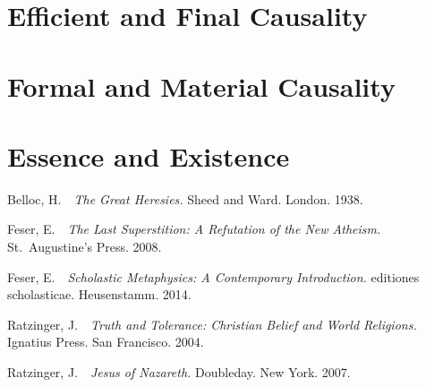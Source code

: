 \documentclass[twocolumn]{article}
\begin{document}
\section{Efficient and Final Causality}

\section{Formal and Material Causality}

\section{Essence and Existence}



\begin{thebibliography}{}

      Belloc, H.\ \ {\it The Great Heresies.}  Sheed and Ward.  London.  1938.

      Feser, E.\ \ {\it The Last Superstition: A Refutation of the New
      Atheism.}  St.~Augustine's Press.  2008.

      Feser, E.\ \ {\it Scholastic Metaphysics: A Contemporary Introduction.}
      editiones scholasticae.  Heusenstamm.  2014.

      Ratzinger, J.\ \ {\it Truth and Tolerance: Christian Belief and World
      Religions.}  Ignatius Press.  San Francisco.  2004.

      Ratzinger, J.\ \ {\it Jesus of Nazareth.}  Doubleday.  New York.  2007.

\end{thebibliography}
\end{document}
